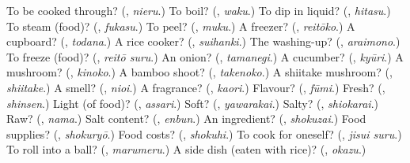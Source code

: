 \begin{tcolorbox}[breakable,colback=teal!4,colframe=teal!35!black,title={Before you move on}]
To be cooked through? (\textbf{}, \emph{nieru}.) To boil? (\textbf{}, \emph{waku}.) To dip in liquid? (\textbf{}, \emph{hitasu}.) To steam (food)? (\textbf{}, \emph{fukasu}.) To peel? (\textbf{}, \emph{muku}.) A freezer? (\textbf{}, \emph{reitōko}.) A cupboard? (\textbf{}, \emph{todana}.) A rice cooker? (\textbf{}, \emph{suihanki}.) The washing-up? (\textbf{}, \emph{araimono}.) To freeze (food)? (\textbf{}, \emph{reitō suru}.) An onion? (\textbf{}, \emph{tamanegi}.) A cucumber? (\textbf{}, \emph{kyūri}.) A mushroom? (\textbf{}, \emph{kinoko}.) A bamboo shoot? (\textbf{}, \emph{takenoko}.) A shiitake mushroom? (\textbf{}, \emph{shiitake}.) A smell? (\textbf{}, \emph{nioi}.) A fragrance? (\textbf{}, \emph{kaori}.) Flavour? (\textbf{}, \emph{fūmi}.) Fresh? (\textbf{}, \emph{shinsen}.) Light (of food)? (\textbf{}, \emph{assari}.) Soft? (\textbf{}, \emph{yawarakai}.) Salty? (\textbf{}, \emph{shiokarai}.) Raw? (\textbf{}, \emph{nama}.) Salt content? (\textbf{}, \emph{enbun}.) An ingredient? (\textbf{}, \emph{shokuzai}.) Food supplies? (\textbf{}, \emph{shokuryō}.) Food costs? (\textbf{}, \emph{shokuhi}.) To cook for oneself? (\textbf{}, \emph{jisui suru}.) To roll into a ball? (\textbf{}, \emph{marumeru}.) A side dish (eaten with rice)? (\textbf{}, \emph{okazu}.)
\end{tcolorbox}
